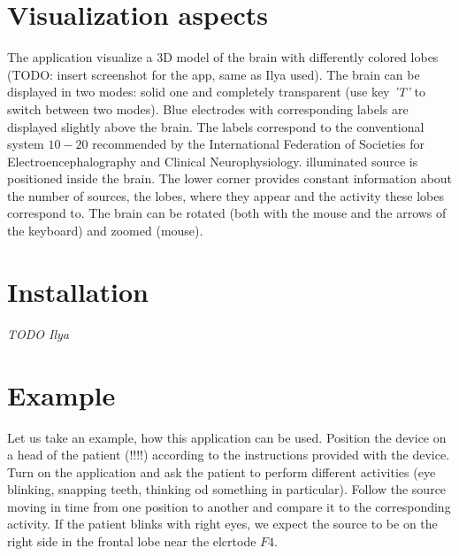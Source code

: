 \documentclass[]{report}   %
\begin{document}
\section{Visualization aspects}
The application visualize a 3D model of the brain with differently colored lobes (TODO: insert screenshot for the app, same as Ilya used). The brain can be displayed in two modes: solid one and completely transparent (use key \emph{'T'} to switch between two modes). Blue electrodes with corresponding labels are displayed slightly above the brain. The labels correspond to the conventional system $10-20$ recommended by the International Federation of Societies for Electroencephalography and Clinical Neurophysiology. illuminated source is positioned inside the brain. The lower corner provides constant information about the number of sources, the lobes, where they appear and the activity these lobes correspond to. The brain can be rotated (both with the mouse and the arrows of the keyboard) and zoomed (mouse). 
\section{Installation}
\emph{TODO Ilya}

\section{Example}
Let us take an example, how this application can be used. Position the device on a head of the patient (!!!!) according to the instructions provided with the device. Turn on the application and ask the patient to perform different activities (eye blinking, snapping teeth, thinking od something in particular). Follow the source moving in time from one position to another and compare it to the corresponding activity. If the patient blinks with right eyes, we expect the source to be on the right side in the frontal lobe near the elcrtode $F4$.  



 
\end{document}
